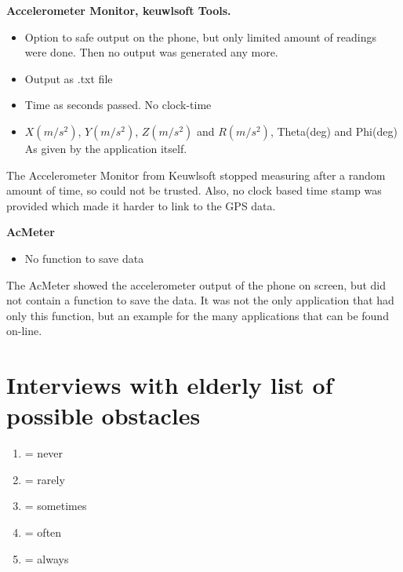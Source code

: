 \begin{appendix}
\textbf{Accelerometer Monitor, keuwlsoft Tools.}
\begin{itemize}
\item Option to safe output on the phone, but only limited amount of readings were done. Then no output was generated any more.
\item Output as .txt file
\item Time as seconds passed. No clock-time
\item $X(m/s^2)$, $Y(m/s^2)$, $Z(m/s^2)$ and $R(m/s^2)$, Theta(deg) and Phi(deg) As given by the application itself. 
\end{itemize}
The Accelerometer Monitor from Keuwlsoft stopped measuring after a random amount of time, so could not be trusted. Also, no clock based time stamp was provided which made it harder to link to the GPS data.

\textbf{AcMeter}
\begin{itemize}
\item No function to save data
\end{itemize}
The AcMeter showed the accelerometer output of the phone on screen, but did not contain a function to save the data. It was not the only application that had only this function, but an example for the many applications that can be found on-line. 

\clearpage

\section{Interviews with elderly list of possible obstacles}\label{Aelderly}
\begin{enumerate}
	\item = never
	\item = rarely
	\item = sometimes
	\item = often
	\item = always
\end{enumerate}


\end{appendix}
